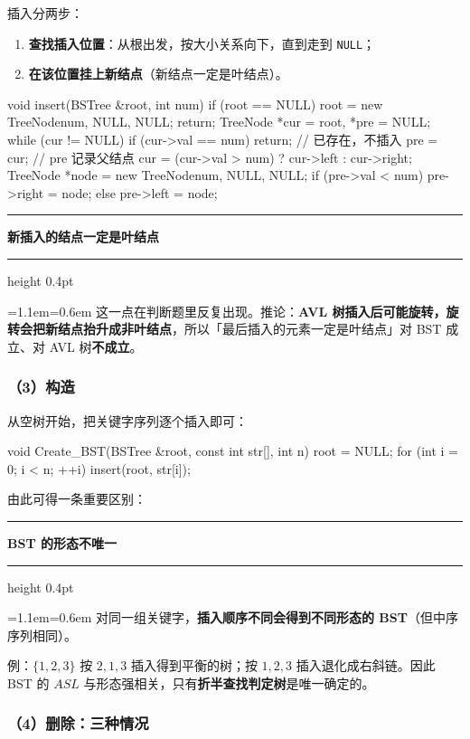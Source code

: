 \documentclass[11pt,openany,UTF8]{ctexbook}
\newcommand{\callouthead}[2]{%
  \par\addvspace{7pt}\noindent
  {\color{#1}\rule[-0.15em]{3pt}{1.05em}}\hspace{0.5em}%
  {\bfseries\color{#1}#2}\par\nobreak\vspace{-0.35em}%
  {\color{rulesep}\hrule height 0.4pt}\nobreak\vspace{0.45em}%
  \begingroup\small\setlength{\parindent}{0pt}%
  \leftskip=1.1em\rightskip=0.6em\noindent\ignorespaces}
\newcommand{\calloutend}{\par\endgroup\addvspace{7pt}}
\newenvironment{callkey}[1]{\callouthead{keybar}{#1}}{\calloutend}
\newenvironment{callwarn}[1]{\callouthead{warnbar}{#1}}{\calloutend}
\begin{document}
插入分两步：

\begin{enumerate}
\item \textbf{查找插入位置}：从根出发，按大小关系向下，直到走到 \texttt{NULL}；
\item \textbf{在该位置挂上新结点}（新结点一定是叶结点）。
\end{enumerate}
\begin{codebox}
void insert(BSTree &root, int num) {
    if (root == NULL) { root = new TreeNode{num, NULL, NULL}; return; }
    TreeNode *cur = root, *pre = NULL;
    while (cur != NULL) {
        if (cur->val == num) return;      // 已存在，不插入
        pre = cur;                        // pre 记录父结点
        cur = (cur->val > num) ? cur->left : cur->right;
    }
    TreeNode *node = new TreeNode{num, NULL, NULL};
    if (pre->val < num) pre->right = node;
    else                pre->left  = node;
}
\end{codebox}

\begin{callkey}{新插入的结点一定是叶结点}
这一点在判断题里反复出现。推论：\textbf{AVL 树插入后可能旋转，旋转会把新结点抬升成非叶结点}，所以「最后插入的元素一定是叶结点」对 BST 成立、对 AVL 树\textbf{不成立}。

\end{callkey}

\subsubsection{（3）构造}

从空树开始，把关键字序列逐个插入即可：

\begin{codebox}
void Create_BST(BSTree &root, const int str[], int n) {
    root = NULL;
    for (int i = 0; i < n; ++i) insert(root, str[i]);
}
\end{codebox}

由此可得一条重要区别：

\begin{callwarn}{BST 的形态不唯一}
对同一组关键字，\textbf{插入顺序不同会得到不同形态的 BST}（但中序序列相同）。

例：$\{1,2,3\}$ 按 $2,1,3$ 插入得到平衡的树；按 $1,2,3$ 插入退化成右斜链。因此 BST 的 $ASL$ 与形态强相关，只有\textbf{折半查找判定树}是唯一确定的。

\end{callwarn}

\subsubsection{（4）删除：三种情况}
\end{document}
